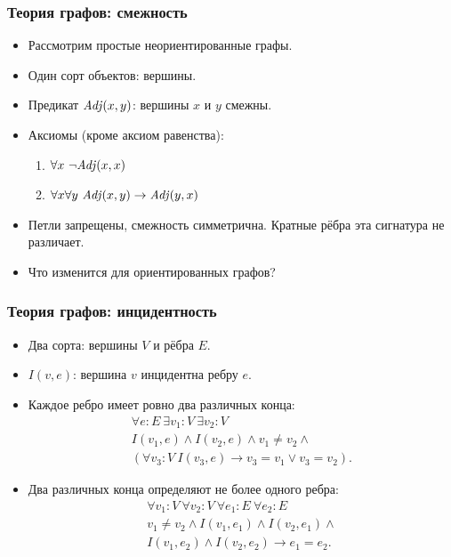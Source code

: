\documentclass[10pt]{beamer}
\begin{document}
\begin{frame}
    \frametitle{Теория графов: смежность}
    \begin{itemize}
        \item Рассмотрим простые неориентированные графы.
        \item Один сорт объектов: вершины.
        \item Предикат $\mathit{Adj}(x,y)$: вершины $x$ и $y$ смежны.
        \item Аксиомы (кроме аксиом равенства):
        \begin{enumerate}
            \item $\forall x~\neg \mathit{Adj}(x,x)$ \pause
            \item $\forall x\forall y~\mathit{Adj}(x,y)\to \mathit{Adj}(y,x)$
        \end{enumerate}
        \pause
        \item Петли запрещены, смежность симметрична. Кратные рёбра эта сигнатура не различает.
        \item Что изменится для ориентированных графов?
    \end{itemize}
\end{frame}

\begin{frame}
    \frametitle{Теория графов: инцидентность}
    \begin{itemize}
        \item Два сорта: вершины $V$ и рёбра $E$.
        \item $I(v,e)$: вершина $v$ инцидентна ребру $e$.
        \item Каждое ребро имеет ровно два различных конца:
        \[
        \begin{gathered}
            \forall e:E~\exists v_1:V~\exists v_2:V\\
            I(v_1,e)\land I(v_2,e)\land v_1\ne v_2\land\\
            (\forall v_3:V~I(v_3,e)\to v_3=v_1\lor v_3=v_2).
        \end{gathered}
        \]
        \pause
        \item Два различных конца определяют не более одного ребра:
        \[
        \begin{gathered}
            \forall v_1:V~\forall v_2:V~\forall e_1:E~\forall e_2:E\\
            v_1\ne v_2\land I(v_1,e_1)\land I(v_2,e_1)\land\\
            I(v_1,e_2)\land I(v_2,e_2)\to e_1=e_2.
        \end{gathered}
        \]
    \end{itemize}
\end{frame}
\end{document}
